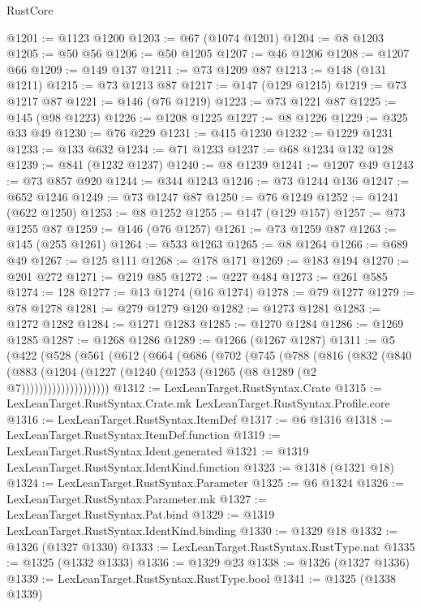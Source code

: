 \begin{lexlean}{RustCore}
\begin{coremodule}
@1201 := @1123 @1200
@1203 := @67 (@1074 @1201)
@1204 := @8 @1203
@1205 := @50 @56
@1206 := @50 @1205
@1207 := @46 @1206
@1208 := @1207 @66
@1209 := @149 @137
@1211 := @73 @1209 @87
@1213 := @148 (@131 @1211)
@1215 := @73 @1213 @87
@1217 := @147 (@129 @1215)
@1219 := @73 @1217 @87
@1221 := @146 (@76 @1219)
@1223 := @73 @1221 @87
@1225 := @145 (@98 @1223)
@1226 := @1208 @1225
@1227 := @8 @1226
@1229 := @325 @33 @49
@1230 := @76 @229
@1231 := @415 @1230
@1232 := @1229 @1231
@1233 := @133 @632
@1234 := @71 @1233
@1237 := @68 @1234 @132 @128
@1239 := @841 (@1232 @1237)
@1240 := @8 @1239
@1241 := @1207 @49
@1243 := @73 @857 @920
@1244 := @344 @1243
@1246 := @73 @1244 @136
@1247 := @652 @1246
@1249 := @73 @1247 @87
@1250 := @76 @1249
@1252 := @1241 (@622 @1250)
@1253 := @8 @1252
@1255 := @147 (@129 @157)
@1257 := @73 @1255 @87
@1259 := @146 (@76 @1257)
@1261 := @73 @1259 @87
@1263 := @145 (@255 @1261)
@1264 := @533 @1263
@1265 := @8 @1264
@1266 := @689 @49
@1267 := @125 @111
@1268 := @178 @171
@1269 := @183 @194
@1270 := @201 @272
@1271 := @219 @85
@1272 := @227 @484
@1273 := @261 @585
@1274 := 128
@1277 := @13 @1274 (@16 @1274)
@1278 := @79 @1277
@1279 := @78 @1278
@1281 := @279 @1279 @120
@1282 := @1273 @1281
@1283 := @1272 @1282
@1284 := @1271 @1283
@1285 := @1270 @1284
@1286 := @1269 @1285
@1287 := @1268 @1286
@1289 := @1266 (@1267 @1287)
@1311 := @5
    (@422
      (@528
        (@561
          (@612
            (@664
              (@686
                (@702
                  (@745
                    (@788
                      (@816
                        (@832
                          (@840
                            (@883
                              (@1204
                                (@1227 (@1240 (@1253 (@1265 (@8 @1289 (@2 @7))))))))))))))))))))
@1312 := LexLeanTarget.RustSyntax.Crate
@1315 := LexLeanTarget.RustSyntax.Crate.mk LexLeanTarget.RustSyntax.Profile.core
@1316 := LexLeanTarget.RustSyntax.ItemDef
@1317 := @6 @1316
@1318 := LexLeanTarget.RustSyntax.ItemDef.function
@1319 := LexLeanTarget.RustSyntax.Ident.generated
@1321 := @1319 LexLeanTarget.RustSyntax.IdentKind.function
@1323 := @1318 (@1321 @18)
@1324 := LexLeanTarget.RustSyntax.Parameter
@1325 := @6 @1324
@1326 := LexLeanTarget.RustSyntax.Parameter.mk
@1327 := LexLeanTarget.RustSyntax.Pat.bind
@1329 := @1319 LexLeanTarget.RustSyntax.IdentKind.binding
@1330 := @1329 @18
@1332 := @1326 (@1327 @1330)
@1333 := LexLeanTarget.RustSyntax.RustType.nat
@1335 := @1325 (@1332 @1333)
@1336 := @1329 @23
@1338 := @1326 (@1327 @1336)
@1339 := LexLeanTarget.RustSyntax.RustType.bool
@1341 := @1325 (@1338 @1339)

\end{coremodule}
\end{lexlean}
